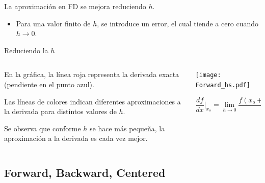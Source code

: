 \documentclass{beamer}
\begin{document}
\begin{frame}

La aproximaci\'on en FD se mejora reduciendo $h$. 
\begin{itemize}
	\item {\small Para una valor finito de $h$, se introduce un error, el cual tiende a cero cuando $h \to 0$.}
\end{itemize}

{\footnotesize 
\begin{block}{Reduciendo la $h$}
\begin{columns}[t]
	\begin{column}[t]{0.35\textwidth}

En la gráfica, la línea roja representa la derivada exacta (pendiente en el punto azul).

\strut

Las líneas de colores indican diferentes aproximaciones a la derivada para distintos valores de $h$.

\strut

Se observa que conforme $h$ se hace más pequeña, la aproximación a la derivada es cada vez mejor.
	\end{column}
	\begin{column}[t]{0.60\textwidth}
\texttt{[image: Forward\_hs.pdf]}

	\[
	\frac{d f}{d x}\Big|_{x_o} =
	\lim_{h \to 0} \frac{f(x_o+h) - f(x_o)}{h}
	\]
	\end{column}
\end{columns}
\end{block}
}

\end{frame}

\subsection{Forward, Backward, Centered}
\end{document}
